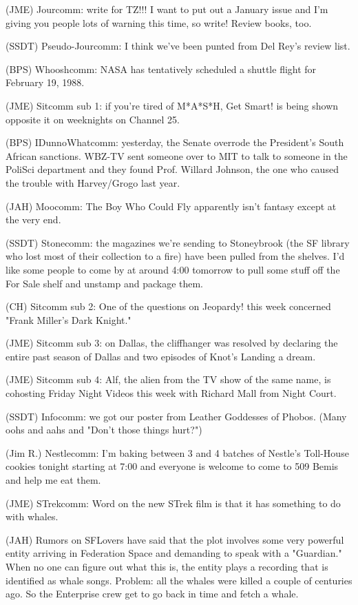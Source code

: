 \documentclass[12pt]{article}
\begin{document}
(JME) Jourcomm: write for TZ!!! I want to put out a January issue and I'm giving you people lots of warning this time, so write! Review books, too.

(SSDT) Pseudo-Jourcomm: I think we've been punted from Del Rey's review list.

(BPS) Whooshcomm: NASA has tentatively scheduled a shuttle flight for February 19, 1988.

(JME) Sitcomm sub 1: if you're tired of M*A*S*H, Get Smart! is being shown opposite it on weeknights on Channel 25.

(BPS) IDunnoWhatcomm: yesterday, the Senate overrode the President's South African sanctions. WBZ-TV sent someone over to MIT to talk to someone in the PoliSci department and they found Prof. Willard Johnson, the one who caused the trouble with Harvey/Grogo last year.

(JAH) Moocomm: The Boy Who Could Fly apparently isn't fantasy except at the very end.

(SSDT) Stonecomm: the magazines we're sending to Stoneybrook (the SF library who lost most of their collection to a fire) have been pulled from the shelves. I'd like some people to come by at around 4:00 tomorrow to pull some stuff off the For Sale shelf and unstamp and package them.

(CH) Sitcomm sub 2: One of the questions on Jeopardy! this week concerned "Frank Miller's Dark Knight."

(JME) Sitcomm sub 3: on Dallas, the cliffhanger was resolved by declaring the entire past season of Dallas and two episodes of Knot's Landing a dream.

(JME) Sitcomm sub 4: Alf, the alien from the TV show of the same name, is cohosting Friday Night Videos this week with Richard Mall from Night Court.

(SSDT) Infocomm: we got our poster from Leather Goddesses of Phobos. (Many oohs and aahs and "Don't those things hurt?")

(Jim R.) Nestlecomm: I'm baking between 3 and 4 batches of Nestle's Toll-House cookies tonight starting at 7:00 and everyone is welcome to come to 509 Bemis and help me eat them.

(JME) STrekcomm: Word on the new STrek film is that it has something to do with whales.

(JAH) Rumors on SFLovers have said that the plot involves some very powerful entity arriving in Federation Space and demanding to speak with a "Guardian." When no one can figure out what this is, the entity plays a recording that is identified as whale songs. Problem: all the whales were killed a couple of centuries ago. So the Enterprise crew get to go back in time and fetch a whale.
\end{document}
